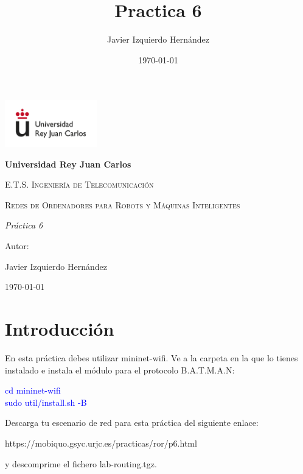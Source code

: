 \documentclass[12pt, a4paper]{report}
\title{Practica 6}
\author{Javier Izquierdo Hernández}
\date{\today}
\begin{document}
	\begin{titlepage}
		\centering
		{\includegraphics[width=0.3\textwidth]{logo}\par}
		\vspace{1cm}
		{\bfseries\LARGE Universidad Rey Juan Carlos \par}
		\vspace{1cm}
		{\scshape\Large E.T.S. Ingeniería de Telecomunicación \par}
		\vspace{3cm}
		{\scshape\Huge Redes de Ordenadores para Robots y Máquinas Inteligentes \par}
		\vspace{3cm}
		{\itshape\Large Práctica 6\par}
		\vfill
		{\Large Autor: \par}
		{\Large Javier Izquierdo Hernández \par}
		\vfill
		{\Large \today \par}
	\end{titlepage}

\newpage
\renewcommand{\contentsname}{Contenidos}
\tableofcontents
\newpage

\chapter*{Introducción}
En esta práctica debes utilizar mininet-wifi. Ve a la carpeta en la que lo tienes instalado e instala
el módulo para el protocolo B.A.T.M.A.N:
\begin{center}
	\textcolor{blue}{cd mininet-wifi}\\
	\textcolor{blue}{sudo util/install.sh -B}
\end{center}
Descarga tu escenario de red para esta práctica del siguiente enlace:
\begin{center}
	https://mobiquo.gsyc.urjc.es/practicas/ror/p6.html
\end{center}
y descomprime el fichero lab-routing.tgz.
\end{document}
